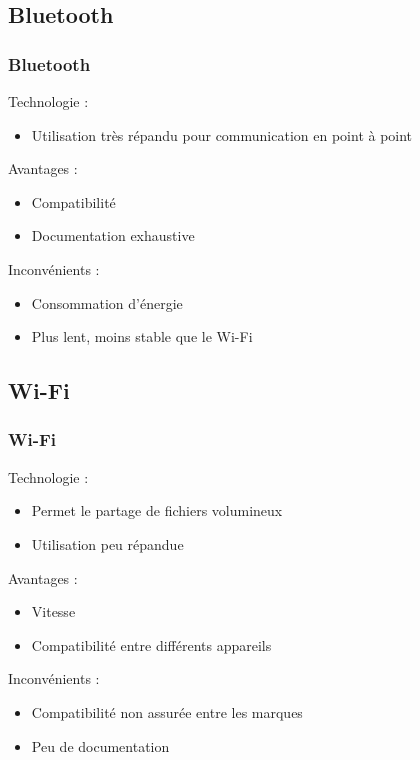 \documentclass{beamer}
\begin{document}
      \subsection{Bluetooth}
      \begin{frame}
	  \frametitle{Bluetooth}
	  \begin{block}{Technologie :}
	  \begin{itemize}
	   \item Utilisation très répandu pour communication en point à point
	  \end{itemize}
	  \end{block}
	  \begin{block}{Avantages :}
	  \begin{itemize}
	   \item Compatibilité
	   \item Documentation exhaustive
	  \end{itemize}
	  \end{block}
	  \begin{block}{Inconvénients :}
	  \begin{itemize}
	   \item Consommation d'énergie
	   \item Plus lent, moins stable que le Wi-Fi
	  \end{itemize}
	  \end{block}
      \end{frame}
      \subsection{Wi-Fi}
      \begin{frame}
	  \frametitle{Wi-Fi}
	  \begin{block}{Technologie :}
	  \begin{itemize}
	   \item Permet le partage de fichiers volumineux
	   \item Utilisation peu répandue
	  \end{itemize}
	  \end{block}
	  \begin{block}{Avantages :}
	  \begin{itemize}
	   \item Vitesse
	   \item Compatibilité entre différents appareils
	  \end{itemize}
	  \end{block}
	  \begin{block}{Inconvénients :}
	  \begin{itemize}
	   \item Compatibilité non assurée entre les marques
	   \item Peu de documentation
	  \end{itemize}
	  \end{block}
      \end{frame}
\end{document}
